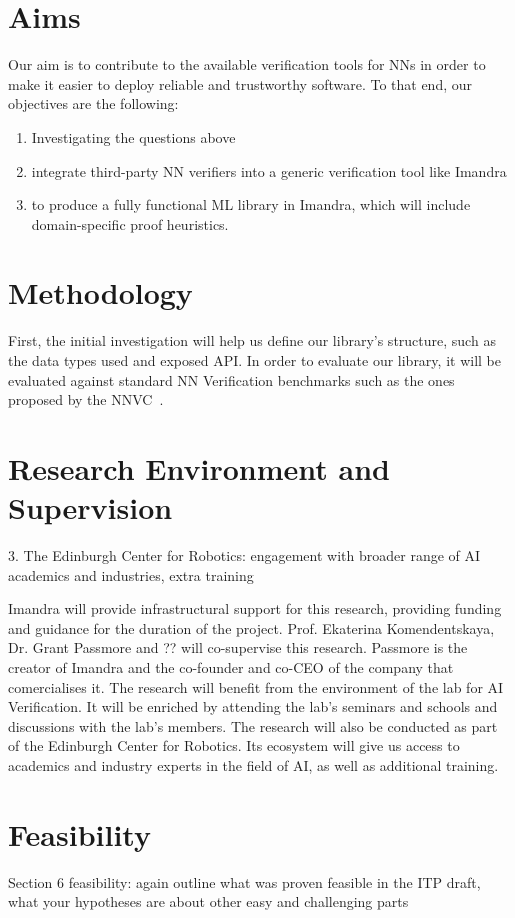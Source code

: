 \documentclass[]{article}
\begin{document}
\section{Aims}
Our aim is to contribute to the available verification tools for NNs in order to make it easier to deploy reliable and trustworthy software. To that end, our objectives are the following:
\begin{enumerate}
\item Investigating the questions above
\item integrate third-party NN verifiers into a generic verification tool like Imandra
\item to produce a fully functional ML library in Imandra, which will include domain-specific proof heuristics.
\end{enumerate}

\section{Methodology}
First, the initial investigation will help us define our library's structure, such as the data types used and exposed API. 
In order to evaluate our library, it will be evaluated against standard NN Verification benchmarks such as the ones proposed by the NNVC~\cite{}.

\section{Research Environment and Supervision}
3. The Edinburgh Center for Robotics: engagement with broader range of AI academics and industries, extra training

Imandra will provide infrastructural support for this research, providing funding and guidance for the duration of the project.
Prof. Ekaterina Komendentskaya, Dr. Grant Passmore and ?? will co-supervise this research. Passmore is the creator of Imandra and the co-founder and co-CEO of the company that comercialises it.
The research will benefit from the environment of the lab for AI Verification. It will be enriched by attending the lab's seminars and schools and discussions with the lab's members. 
The research will also be conducted as part of the Edinburgh Center for Robotics. Its ecosystem will give us access to academics and industry experts in the field of AI, as well as additional training.


\section{Feasibility}
Section 6 feasibility: again outline what was proven feasible in the ITP draft, what your hypotheses are about other easy and challenging parts
\end{document}
